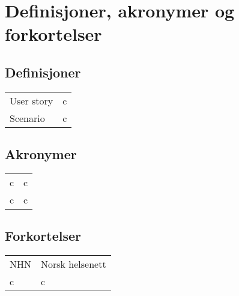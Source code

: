 \section{Definisjoner, akronymer og forkortelser}

\subsection*{Definisjoner}
\begin{table}[H]
\begin{tabular}{l l}  
User story & c\\  
Scenario & c\\ 
\end{tabular}
\end{table}

\subsection*{Akronymer}
\begin{table}[H]
\begin{tabular}{l l}  
c & c\\  
c & c\\ 
\end{tabular}
\end{table}

\subsection*{Forkortelser}
\begin{table}[H]
\begin{tabular}{l l}  
NHN & Norsk helsenett\\  
c & c\\ 
\end{tabular}
\end{table}